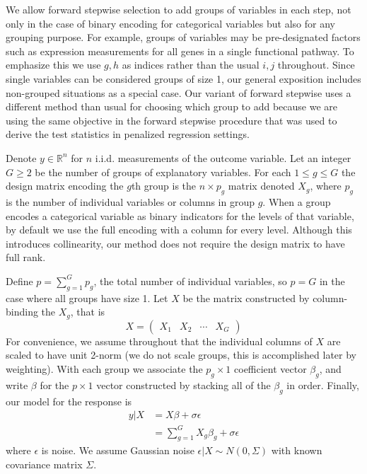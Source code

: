 \documentclass{imsart}
\newcommand{\real}{\mathbb{R}}
\begin{document}
We allow forward stepwise selection to add groups of variables in each
step, not only in the case of binary encoding for categorical
variables but also for any grouping purpose. For example, groups of
variables may be pre-designated factors such as expression
measurements for all genes in a single functional pathway.
To emphasize this we use $g, h$ as indices rather than the usual
$i, j$ throughout. Since single variables can be considered groups of
size 1, our general exposition includes non-grouped situations as a special
case. Our variant of forward stepwise uses a different method than
usual for choosing which group to add because we are using the
same objective in the forward stepwise procedure that was used to
derive the test statistics in penalized regression settings.

Denote $y \in \real^n$ for $n$ i.i.d. measurements of the outcome variable.
Let an integer $G \geq 2$ be the number of groups of explanatory variables.
For each $1 \leq g \leq G$ the design matrix encoding the
$g$th group is the $n \times p_g$ matrix denoted $X_g$, where $p_g$ is
the number of individual variables or columns in group $g$.
When a group encodes a categorical variable as binary indicators for the
levels of that variable, by default we use the full encoding with a column for every
level. Although this introduces collinearity, our method does not require
the design matrix to have full rank.


Define $p = \sum_{g=1}^Gp_g$,
the total number of individual variables, so $p = G$ in the
case where all groups have size 1. Let $X$ be the matrix constructed
by column-binding the $X_g$, that is  
\begin{equation*}
X = \begin{pmatrix} X_1 & X_2 & \cdots & X_G  \end{pmatrix}
\end{equation*}
For convenience, we assume throughout that the individual columns of $X$ are scaled to
have unit 2-norm (we do not scale groups, this is accomplished later
by weighting).
With each group we associate the $p_g \times 1$ coefficient vector
$\beta_g$, and write $\beta$ for the $p \times 1$ vector constructed
by stacking all of the $\beta_g$ in order.  Finally, our model for the
response is
\begin{equation}
\begin{aligned}
\label{eq:gmodel}
y | X& = X \beta + \sigma \epsilon \\
   & = \sum_{g=1}^G X_g \beta_g + \sigma \epsilon
\end{aligned}
\end{equation}
where $\epsilon$ is noise. We assume Gaussian noise
$\epsilon | X \sim N(0, \Sigma)$ with known covariance matrix $\Sigma$.
\end{document}
